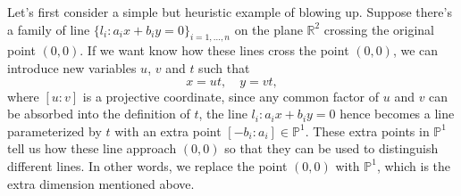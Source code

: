 \documentclass[12pt]{article}
\theoremstyle{definition}
\theoremstyle{plain}
\begin{document}
Let's first consider a simple but heuristic example of blowing up. 
Suppose there's a family of line $\{l_i: a_ix+b_iy=0\}_{i=1,\dots,n}$ on the plane 
$\mathbb R^2$
crossing the original point $(0,0)$. 
If we want know how these lines cross the point $(0,0)$, we can introduce 
new variables $u$, $v$ and $t$ such that
\begin{equation} \label{2dimblowup}
	x=ut,\quad y=vt,
\end{equation} 
where $[u:v]$ is a projective coordinate, since any common factor of $u$ and $v$ can be absorbed into the definition of $t$, the line $l_i:a_ix+b_iy=0$ hence becomes a line parameterized 
by $t$ with an extra point $[-b_i:a_i]\in \mathbb P^1$. These extra points in $\mathbb P^1$ tell us how these line approach $(0,0)$ so that they can be used to distinguish different lines.
In other words, we replace the point $(0,0)$ with $\mathbb P^1$, which is the extra dimension mentioned above. 


\end{document}

